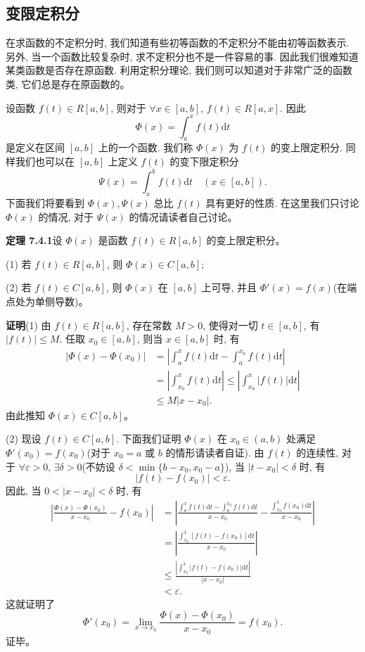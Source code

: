 \documentclass[UTF8,12pt,a4paper,fontset=fandol]{ctexart}
\begin{document}
\subsection{变限定积分}

在求函数的不定积分时, 我们知道有些初等函数的不定积分不能由初等函数表示. 另外, 当一个函数比较复杂时, 求不定积分也不是一件容易的事. 因此我们很难知道某类函数是否存在原函数. 利用定积分理论, 我们则可以知道对于非常广泛的函数类, 它们总是存在原函数的。

设函数 $f(t)\in R[a,b]$, 则对于 $\forall x\in[a,b]$, $f(t)\in R[a,x]$. 因此
\[
  \Phi(x)=\int_a^x f(t)\mathrm dt
\]
是定义在区间 $[a,b]$ 上的一个函数. 我们称 $\Phi(x)$ 为 $f(t)$ 的变上限定积分. 同样我们也可以在 $[a,b]$ 上定义 $f(t)$ 的变下限定积分
\[
  \Psi(x)=\int_x^b f(t)\mathrm dt\quad(x\in[a,b]).
\]
下面我们将要看到 $\Phi(x),\Psi(x)$ 总比 $f(t)$ 具有更好的性质. 在这里我们只讨论 $\Phi(x)$ 的情况, 对于 $\Psi(x)$ 的情况请读者自己讨论。

\noindent\textbf{定理 7.4.1}\quad 设 $\Phi(x)$ 是函数 $f(t)\in R[a,b]$ 的变上限定积分。

(1) 若 $f(t)\in R[a,b]$, 则 $\Phi(x)\in C[a,b]$;

(2) 若 $f(t)\in C[a,b]$, 则 $\Phi(x)$ 在 $[a,b]$ 上可导, 并且 $\Phi'(x)=f(x)$(在端点处为单侧导数)。

\noindent\textbf{证明}\quad (1) 由 $f(t)\in R[a,b]$, 存在常数 $M>0$, 使得对一切 $t\in[a,b]$, 有 $|f(t)|\leq M$. 任取 $x_0\in[a,b]$, 则当 $x\in[a,b]$ 时, 有
\[
\begin{aligned}
  |\Phi(x)-\Phi(x_0)|
  &=\left|\int_a^x f(t)\mathrm dt-\int_a^{x_0} f(t)\mathrm dt\right|\\
  &=\left|\int_{x_0}^x f(t)\mathrm dt\right|
  \leq \left|\int_{x_0}^x |f(t)|\mathrm dt\right|\\
  &\leq M|x-x_0|.
\end{aligned}
\]
由此推知 $\Phi(x)\in C[a,b]$。

(2) 现设 $f(t)\in C[a,b]$. 下面我们证明 $\Phi(x)$ 在 $x_0\in(a,b)$ 处满足 $\Phi'(x_0)=f(x_0)$(对于 $x_0=a$ 或 $b$ 的情形请读者自证). 由 $f(t)$ 的连续性, 对于 $\forall\varepsilon>0$, $\exists\delta>0$(不妨设 $\delta<\min\{b-x_0,x_0-a\}$), 当 $|t-x_0|<\delta$ 时, 有
\[
  |f(t)-f(x_0)|<\varepsilon.
\]
因此, 当 $0<|x-x_0|<\delta$ 时, 有
\[
\begin{aligned}
  \left|\frac{\Phi(x)-\Phi(x_0)}{x-x_0}-f(x_0)\right|
  &=\left|\frac{\int_a^x f(t)\mathrm dt-\int_a^{x_0} f(t)\mathrm dt}{x-x_0}
  -\frac{\int_{x_0}^x f(x_0)\mathrm dt}{x-x_0}\right|\\
  &=\left|\frac{\int_{x_0}^x [f(t)-f(x_0)]\mathrm dt}{x-x_0}\right|\\
  &\leq \frac{\left|\int_{x_0}^x |f(t)-f(x_0)|\mathrm dt\right|}{|x-x_0|}\\
  &<\varepsilon.
\end{aligned}
\]
这就证明了
\[
  \Phi'(x_0)=\lim_{x\to x_0}\frac{\Phi(x)-\Phi(x_0)}{x-x_0}=f(x_0).
\]
证毕。
\end{document}
